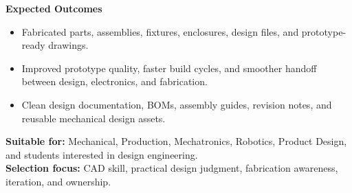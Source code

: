 \documentclass[10pt,a4paper]{article}
\newcommand{\RoleSection}[1]{\vspace{5pt}\par\noindent\textbf{#1}\par\vspace{2pt}}
\begin{document}
{\RoleSection{Expected Outcomes}
\begin{itemize}
  \item Fabricated parts, assemblies, fixtures, enclosures, design files, and prototype-ready drawings.
  \item Improved prototype quality, faster build cycles, and smoother handoff between design, electronics, and fabrication.
  \item Clean design documentation, BOMs, assembly guides, revision notes, and reusable mechanical design assets.
\end{itemize}

\textbf{Suitable for:} Mechanical, Production, Mechatronics, Robotics, Product Design, and students interested in design engineering.\\
\textbf{Selection focus:} CAD skill, practical design judgment, fabrication awareness, iteration, and ownership.
}
\end{document}

